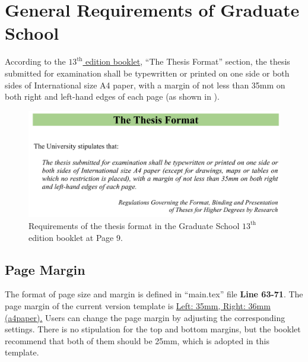 \section{General Requirements of Graduate School}
\label{chap1:sec2:general_requirements_of_graduate_school}
According to the \href{https://intraweb.hku.hk/reserved_1/gradsch/PreparingandSubmittingYourThesis.pdf}{$13^\mathrm{th}$ edition booklet}, ``The Thesis Format'' section, the thesis submitted for examination shall be typewritten or printed on one side or both sides of International size A4 paper, with a margin of not less than 35mm on both right and left-hand edges of each page (as shown in ).
\begin{figure}[!h]
    \centering
    \includegraphics[width=.96\textwidth]{Figures/Chapter1/thesis_requirement.PNG}
    \caption{Requirements of the thesis format in the Graduate School $13^\mathrm{th}$ edition booklet at Page 9.}
    \label{fig:chap1:thesis_requirements}
\end{figure}


\subsection{Page Margin}
\label{chap1:sec:2:subsec1:page_margin}
The format of page size and margin is defined in ``main.tex'' file \textbf{Line 63-71}. The page margin of the current version template is \uline{Left: 35mm, Right: 36mm (a4paper).} Users can change the page margin by adjusting the corresponding settings. There is no stipulation for the top and bottom margins, but the booklet recommend that both of them should be 25mm, which is adopted in this template. 


